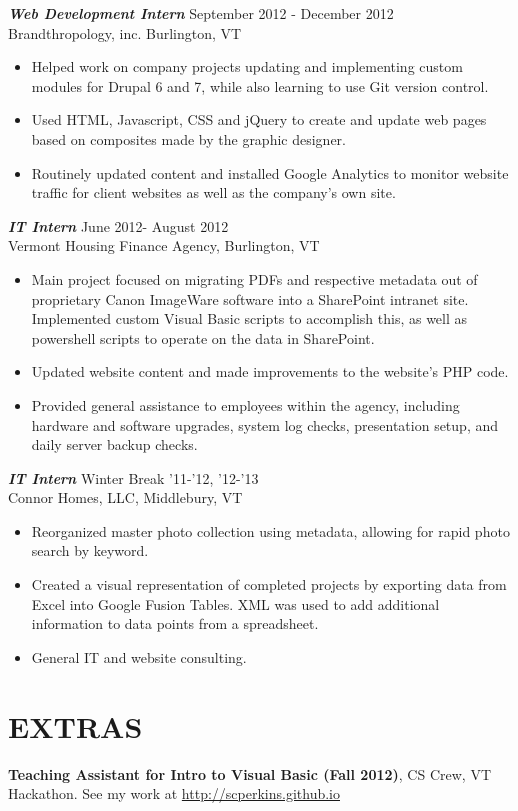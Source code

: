 \documentclass[line,margin]{res}
\begin{document}
\begin{resume}
                {\sl {\bfseries Web Development Intern}}  \hfill September 2012 - December 2012 \\
                Brandthropology, inc.  Burlington, VT
                 \begin{itemize}  \itemsep -2pt %
                 \item Helped work on company projects updating and implementing custom modules for Drupal 6 and 7, while also learning to use Git version control.
                \item Used HTML, Javascript, CSS and jQuery to create and update web pages based on composites made by the graphic designer.
	     \item Routinely updated content and installed Google Analytics to monitor website traffic for client websites as well as the company's own site.
                \end{itemize}
 
                {\sl {\bfseries IT Intern}} \hfill June 2012- August 2012 \\
                Vermont Housing Finance Agency, Burlington, VT
                 \begin{itemize}  \itemsep -2pt 
                 \item Main project focused on migrating PDFs and respective metadata out of proprietary Canon ImageWare software into a SharePoint intranet site. Implemented custom Visual Basic scripts to accomplish this, as well as powershell scripts to operate on the data in SharePoint.
                 \item Updated website content and made improvements to the website's PHP code.
                 \item Provided general assistance to employees within the agency, including hardware and software upgrades, system log checks, presentation setup, and daily server backup checks.
                 \end{itemize} 

	      {\sl {\bfseries IT Intern}} \hfill Winter Break '11-'12, '12-'13 \\
	      Connor Homes, LLC, Middlebury, VT
	     \begin{itemize} \itemsep -2pt 
	      \item Reorganized master photo collection using metadata, allowing for rapid photo search by keyword.
                 \item Created a visual representation of completed projects by exporting data from Excel into Google Fusion Tables. XML 			      was used to add additional information to data points from a spreadsheet. 
                 \item General IT and website consulting.
                 \end{itemize} 
                
 
\section{EXTRAS}             
           {\bf Teaching Assistant for Intro to Visual Basic (Fall 2012)}, 
            CS Crew,
            VT Hackathon.
	    See my work at \url{http://scperkins.github.io}
             

\end{resume}
\end{document}
